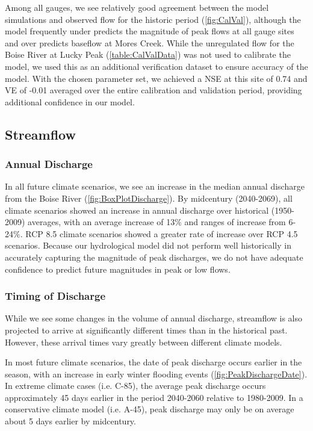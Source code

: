\documentclass[water,article,submit,moreauthors,pdftex,10pt,a4paper]{mdpi}
\theoremstyle{mdpi}
\newcounter{ex}
\newcounter{re}
\theoremstyle{mdpidefinition}
\begin{document}
Among all gauges, we see relatively good agreement between the model simulations and observed flow for the historic period (\cref{fig:CalVal}), although the model frequently under predicts the magnitude of peak flows at all gauge sites and over predicts baseflow at Mores Creek. While the unregulated flow for the Boise River at Lucky Peak (\cref{table:CalValData}) was not used to calibrate the model, we used this as an additional verification dataset to ensure accuracy of the model. With the chosen parameter set, we achieved a NSE at this site of 0.74 and VE of -0.01 averaged over the entire calibration and validation period, providing additional confidence in our model.

\subsection{Streamflow}

\subsubsection{Annual Discharge}

In all future climate scenarios, we see an increase in the median annual discharge from the Boise River (\cref{fig:BoxPlotDischarge}). By midcentury (2040-2069), all climate scenarios showed an increase in annual discharge over historical (1950-2009) averages, with an average increase of 13\% and ranges of increase from 6-24\%. RCP 8.5 climate scenarios showed a greater rate of increase over RCP 4.5 scenarios. Because our hydrological model did not perform well historically in accurately capturing the magnitude of peak discharges, we do not have adequate confidence to predict future magnitudes in peak or low flows. 

\subsubsection{Timing of Discharge}

While we see some changes in the volume of annual discharge, streamflow is also projected to arrive at significantly different times than in the historical past. However, these arrival times vary greatly between different climate models.

In most future climate scenarios, the date of peak discharge occurs earlier in the season, with an increase in early winter flooding events (\cref{fig:PeakDischargeDate}). In extreme climate cases (i.e. C-85), the average peak discharge occurs approximately 45 days earlier in the period 2040-2060 relative to 1980-2009. In a conservative climate model (i.e. A-45), peak discharge may only be on average about 5 days earlier by midcentury. 
\end{document}
